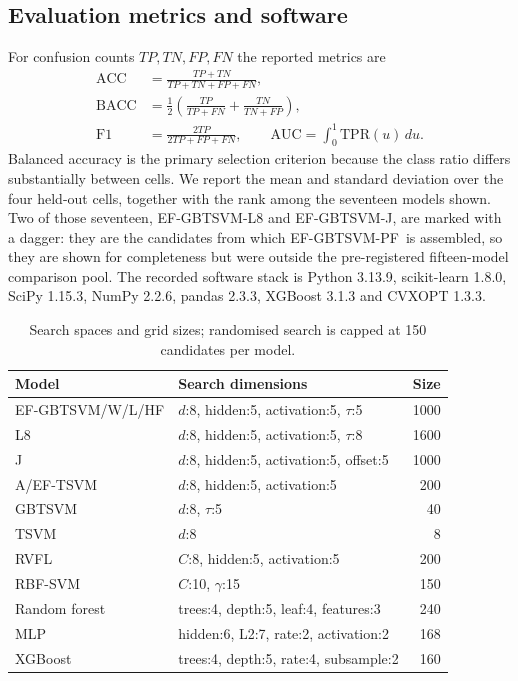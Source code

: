 \documentclass[final,5p,times,twocolumn]{elsarticle}
\newcommand{\proposed}{EF-GBTSVM-PF}
\begin{document}
\subsection{Evaluation metrics and software}
For confusion counts $TP,TN,FP,FN$ the reported metrics are
\begin{align}\mathrm{ACC}&=\frac{TP+TN}{TP+TN+FP+FN},\\\mathrm{BACC}&=\tfrac12\left(\frac{TP}{TP+FN}+\frac{TN}{TN+FP}\right),\\\mathrm{F1}&=\frac{2TP}{2TP+FP+FN},\qquad\mathrm{AUC}=\int_0^1\mathrm{TPR}(u)\,du.\end{align}
Balanced accuracy is the primary selection criterion because the class ratio differs substantially between cells. We report the mean and standard deviation over the four held-out cells, together with the rank among the seventeen models shown. Two of those seventeen, EF-GBTSVM-L8 and EF-GBTSVM-J, are marked with a dagger: they are the candidates from which \proposed\ is assembled, so they are shown for completeness but were outside the pre-registered fifteen-model comparison pool. The recorded software stack is Python 3.13.9, scikit-learn 1.8.0, SciPy 1.15.3, NumPy 2.2.6, pandas 2.3.3, XGBoost 3.1.3 and CVXOPT 1.3.3.
\begin{table}[!t]\centering\scriptsize\caption{Search spaces and grid sizes; randomised search is capped at 150 candidates per model.}\label{tab:search}\begin{tabularx}{\columnwidth}{lXr}\toprule Model&Search dimensions&Size\\\midrule EF-GBTSVM/W/L/HF&$d$:8, hidden:5, activation:5, $\tau$:5&1000\\L8&$d$:8, hidden:5, activation:5, $\tau$:8&1600\\J&$d$:8, hidden:5, activation:5, offset:5&1000\\A/EF-TSVM&$d$:8, hidden:5, activation:5&200\\GBTSVM&$d$:8, $\tau$:5&40\\TSVM&$d$:8&8\\RVFL&$C$:8, hidden:5, activation:5&200\\RBF-SVM&$C$:10, $\gamma$:15&150\\Random forest&trees:4, depth:5, leaf:4, features:3&240\\MLP&hidden:6, L2:7, rate:2, activation:2&168\\XGBoost&trees:4, depth:5, rate:4, subsample:2&160\\\bottomrule\end{tabularx}\end{table}
\end{document}
